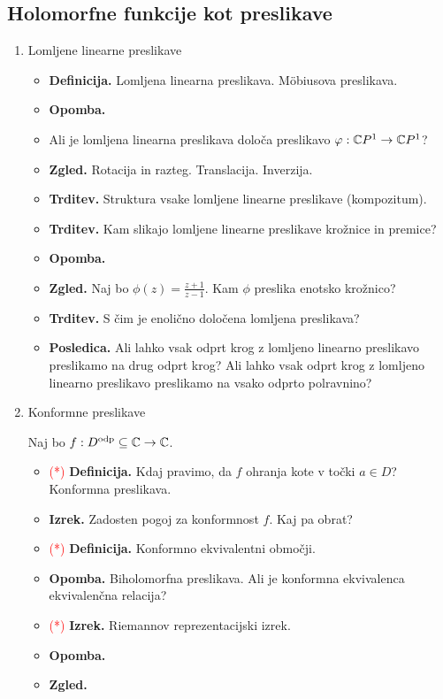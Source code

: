 \subsection{Holomorfne funkcije kot preslikave}
\begin{enumerate}
    \item Lomljene linearne preslikave
    \begin{itemize}
        \item \textbf{Definicija.} Lomljena linearna preslikava. M\"obiusova preslikava.
        \item \textbf{Opomba.} \todo{}
        \item Ali je lomljena linearna preslikava določa preslikavo \(\varphi: \mathbb{C} P^1 \to \mathbb{C} P^1\)?
        \item \textbf{Zgled.} Rotacija in razteg. Translacija. Inverzija.
        \item \textbf{Trditev.} Struktura vsake lomljene linearne preslikave (kompozitum).
        \item \textbf{Trditev.} Kam slikajo lomljene linearne preslikave krožnice in premice?
        \item \textbf{Opomba.} \todo{}
        \item \textbf{Zgled.} Naj bo \(\phi(z) = \frac{z+1}{z-1}\). Kam \(\phi\) preslika enotsko krožnico?
        \item \textbf{Trditev.} S čim je enolično določena lomljena preslikava?
        \item \textbf{Posledica.} Ali lahko vsak odprt krog z lomljeno linearno preslikavo preslikamo na drug odprt krog? Ali lahko vsak odprt krog z lomljeno linearno preslikavo preslikamo na vsako odprto polravnino?
    \end{itemize}

    \item Konformne preslikave
    
    Naj bo \(f: D^\text{odp} \subseteq \mathbb{C} \to \mathbb{C}\).
    \begin{itemize}
        \item \textcolor{red}{(*)} \textbf{Definicija.}  Kdaj pravimo, da \(f\) ohranja kote v točki \(a \in D\)? Konformna preslikava.
        \item \textbf{Izrek.} Zadosten pogoj za konformnost \(f\). Kaj pa obrat?
        \item \textcolor{red}{(*)} \textbf{Definicija.} Konformno ekvivalentni območji. 
        \newpage
        \item \textbf{Opomba.} Biholomorfna preslikava. Ali je konformna ekvivalenca ekvivalenčna relacija?
        \item \textcolor{red}{(*)} \textbf{Izrek.} Riemannov reprezentacijski izrek.
        \item \textbf{Opomba.} \todo{}
        \item \textbf{Zgled.} \todo{}
    \end{itemize} 


\end{enumerate}
